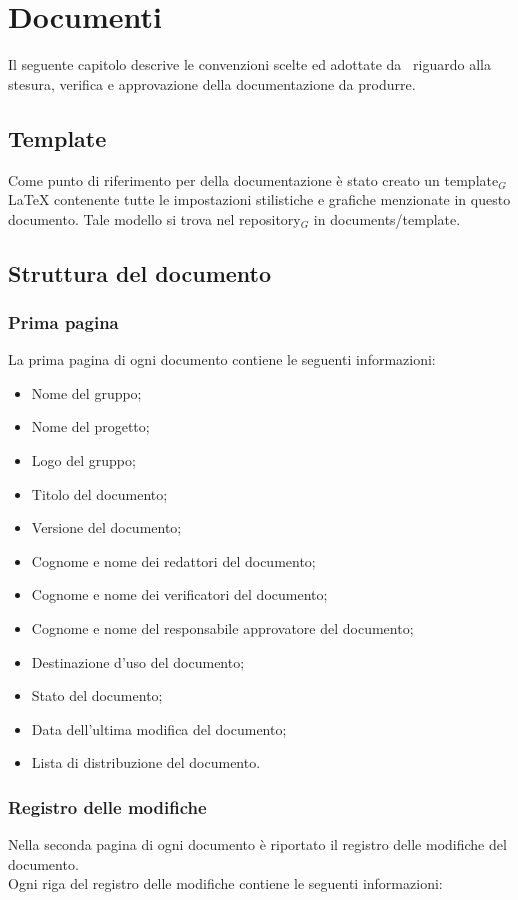 \section{Documenti}
Il seguente capitolo descrive le convenzioni scelte ed adottate da \gruppo\ riguardo alla stesura, verifica e approvazione della documentazione da produrre.

\subsection{Template}
Come punto di riferimento per della documentazione è stato creato un template$_G$ \LaTeX{} contenente tutte le impostazioni stilistiche e grafiche menzionate in questo documento. Tale modello si trova nel repository$_G$ in documents/template.

\subsection{Struttura del documento}

\subsubsection{Prima pagina}
La prima pagina di ogni documento contiene le seguenti informazioni:
\smallbreak
\begin{itemize}
\item Nome del gruppo;
\item Nome del progetto;
\item Logo del gruppo;
\item Titolo del documento;
\item Versione del documento;
\item Cognome e nome dei redattori del documento;
\item Cognome e nome dei verificatori del documento;
\item Cognome e nome del responsabile approvatore del documento;
\item Destinazione d'uso del documento;
\item Stato del documento;
\item Data dell'ultima modifica del documento;
\item Lista di distribuzione del documento.
\end{itemize}

\subsubsection{Registro delle modifiche}
Nella seconda pagina di ogni documento è riportato il registro delle modifiche del documento. \\ 
Ogni riga del registro delle modifiche contiene le seguenti informazioni:

